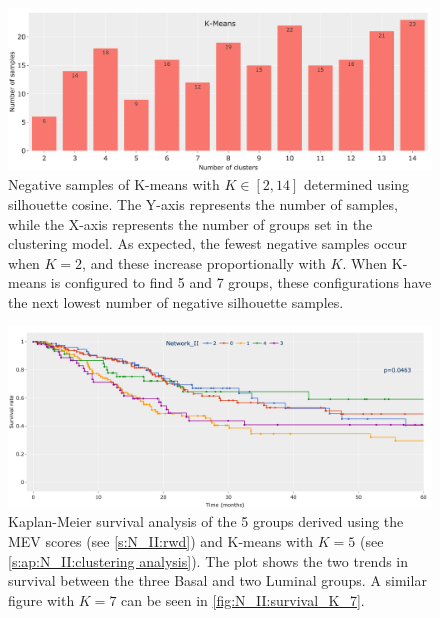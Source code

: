 \begin{figure}[H]    
    \centering
    \includegraphics[width=1.0\textwidth,height=1.0\textheight,keepaspectratio]{Sections/Network_II/resources/reward/cluster_analysis/neg_samples.png}
    \caption[Negative silhouette samples]{Negative samples of K-means with $K \in [2,14]$ determined using silhouette cosine. The Y-axis represents the number of samples, while the X-axis represents the number of groups set in the clustering model. As expected, the fewest negative samples occur when $K=2$, and these increase proportionally with $K$. When K-means is configured to find 5 and 7 groups, these configurations have the next lowest number of negative silhouette samples.}
    \label{fig:ap:neg_samples}
\end{figure}

\begin{figure}[H]    
    \centering
    \includegraphics[width=1.0\textwidth,height=1.0\textheight,keepaspectratio]{Sections/Network_II/resources/reward/cluster_analysis/survival_K_5.png}
    \caption[Kaplan-Meier survival for when K=5 in K-means clustering]{Kaplan-Meier survival analysis of the 5 groups derived using the MEV scores (see \cref{s:N_II:rwd}) and K-means with $K=5$ (see \cref{s:ap:N_II:clustering analysis}). The plot shows the two trends in survival between the three Basal and two Luminal groups. A similar figure with $K=7$ can be seen in \cref{fig:N_II:survival_K_7}.}
    \label{fig:ap:survival_K_5}
\end{figure}


